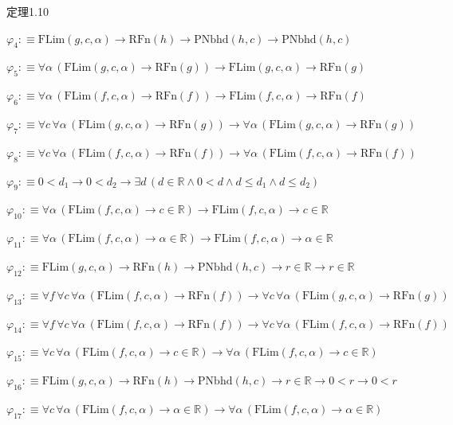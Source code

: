 \begin{fullproof}{定理1.10}
\begin{abbrevlist}
\item $\varphi_{4} :\equiv \mathrm{FLim}(g,c,\alpha) \to \mathrm{RFn}(h) \to \mathrm{PNbhd}(h,c) \to \mathrm{PNbhd}(h,c)$
\item $\varphi_{5} :\equiv \forall \alpha\,(\mathrm{FLim}(g,c,\alpha) \to \mathrm{RFn}(g)) \to \mathrm{FLim}(g,c,\alpha) \to \mathrm{RFn}(g)$
\item $\varphi_{6} :\equiv \forall \alpha\,(\mathrm{FLim}(f,c,\alpha) \to \mathrm{RFn}(f)) \to \mathrm{FLim}(f,c,\alpha) \to \mathrm{RFn}(f)$
\item $\varphi_{7} :\equiv \forall c\,\forall \alpha\,(\mathrm{FLim}(g,c,\alpha) \to \mathrm{RFn}(g)) \to \forall \alpha\,(\mathrm{FLim}(g,c,\alpha) \to \mathrm{RFn}(g))$
\item $\varphi_{8} :\equiv \forall c\,\forall \alpha\,(\mathrm{FLim}(f,c,\alpha) \to \mathrm{RFn}(f)) \to \forall \alpha\,(\mathrm{FLim}(f,c,\alpha) \to \mathrm{RFn}(f))$
\item $\varphi_{9} :\equiv 0 < d_{1} \to 0 < d_{2} \to \exists d\,(d \in \mathbb{R} \land 0 < d \land d \leq d_{1} \land d \leq d_{2})$
\item $\varphi_{10} :\equiv \forall \alpha\,(\mathrm{FLim}(f,c,\alpha) \to c \in \mathbb{R}) \to \mathrm{FLim}(f,c,\alpha) \to c \in \mathbb{R}$
\item $\varphi_{11} :\equiv \forall \alpha\,(\mathrm{FLim}(f,c,\alpha) \to \alpha \in \mathbb{R}) \to \mathrm{FLim}(f,c,\alpha) \to \alpha \in \mathbb{R}$
\item $\varphi_{12} :\equiv \mathrm{FLim}(g,c,\alpha) \to \mathrm{RFn}(h) \to \mathrm{PNbhd}(h,c) \to r \in \mathbb{R} \to r \in \mathbb{R}$
\item $\varphi_{13} :\equiv \forall f\,\forall c\,\forall \alpha\,(\mathrm{FLim}(f,c,\alpha) \to \mathrm{RFn}(f)) \to \forall c\,\forall \alpha\,(\mathrm{FLim}(g,c,\alpha) \to \mathrm{RFn}(g))$
\item $\varphi_{14} :\equiv \forall f\,\forall c\,\forall \alpha\,(\mathrm{FLim}(f,c,\alpha) \to \mathrm{RFn}(f)) \to \forall c\,\forall \alpha\,(\mathrm{FLim}(f,c,\alpha) \to \mathrm{RFn}(f))$
\item $\varphi_{15} :\equiv \forall c\,\forall \alpha\,(\mathrm{FLim}(f,c,\alpha) \to c \in \mathbb{R}) \to \forall \alpha\,(\mathrm{FLim}(f,c,\alpha) \to c \in \mathbb{R})$
\item $\varphi_{16} :\equiv \mathrm{FLim}(g,c,\alpha) \to \mathrm{RFn}(h) \to \mathrm{PNbhd}(h,c) \to r \in \mathbb{R} \to 0 < r \to 0 < r$
\item $\varphi_{17} :\equiv \forall c\,\forall \alpha\,(\mathrm{FLim}(f,c,\alpha) \to \alpha \in \mathbb{R}) \to \forall \alpha\,(\mathrm{FLim}(f,c,\alpha) \to \alpha \in \mathbb{R})$

\end{abbrevlist}
\end{fullproof}
